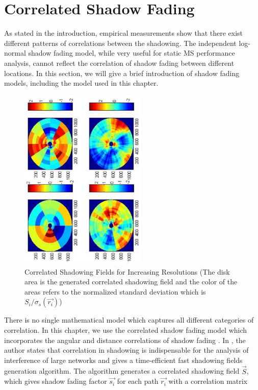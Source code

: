 \section{Correlated Shadow Fading}
\label{sec:Shadow}
As stated in the introduction, empirical measurements show that there exist different patterns of correlations between the shadowing. The independent log-normal shadow fading model, while very useful for static MS performance analysis, cannot reflect the correlation of shadow fading between different locations. In this section, we will give a brief introduction of shadow fading models, including the model used in this chapter.
\begin{figure}
\centering
\includegraphics[width=6cm,angle=270]{shadowingfield_V3.eps}
\caption{Correlated Shadowing Fields for Increasing Resolutions (The disk area is the generated correlated shadowing field and the color of the areas refers to the normalized standard deviation which is $S_{i}/\sigma_{s}(\vec{r_{i}})$)}
\label{2:shadowingfield}
\end{figure}
There is no single mathematical model which captures all different categories of correlation\cite{szyszkowicz2010feasibility}. In this chapter, we use the correlated shadow fading model which incorporates the angular and distance correlations of shadow fading \cite{szyszkowicz2011interference}. In \cite{szyszkowicz2011interference}, the author states that correlation in shadowing is indispensable for the analysis of interference of large networks and gives a time-efficient fast shadowing fields generation algorithm. The algorithm generates a correlated shadowing field $\vec{S}$, which gives shadow fading factor $\vec{s_{i}}$ for each path $\vec{r_{i}}$ with a correlation matrix

